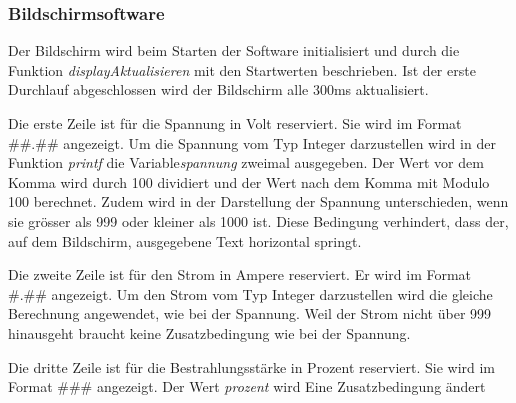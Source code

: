 \subsubsection{Bildschirmsoftware}
Der Bildschirm wird beim Starten der Software initialisiert und durch die Funktion \textit{displayAktualisieren} mit den Startwerten beschrieben. Ist der erste Durchlauf abgeschlossen wird der Bildschirm alle 300ms aktualisiert.

Die erste Zeile ist für die Spannung in Volt reserviert. Sie wird im Format \#\#.\#\# angezeigt. Um die Spannung vom Typ Integer darzustellen wird in der Funktion \textit{printf} die Variable\textit{spannung} zweimal ausgegeben. Der Wert vor dem Komma wird durch 100 dividiert und der Wert nach dem Komma mit Modulo 100 berechnet. Zudem wird in der Darstellung der Spannung unterschieden, wenn sie grösser als 999 oder kleiner als 1000 ist. Diese Bedingung verhindert, dass der, auf dem Bildschirm, ausgegebene Text horizontal springt. 

Die zweite Zeile ist für den Strom in Ampere reserviert. Er wird im Format \#.\#\# angezeigt. Um den Strom vom Typ Integer darzustellen wird die gleiche Berechnung angewendet, wie bei der Spannung. Weil der Strom nicht über 999 hinausgeht braucht keine Zusatzbedingung wie bei der Spannung.

Die dritte Zeile ist für die Bestrahlungsstärke in Prozent reserviert. Sie wird im Format \#\#\# angezeigt. Der Wert \textit{prozent} wird  Eine Zusatzbedingung ändert 